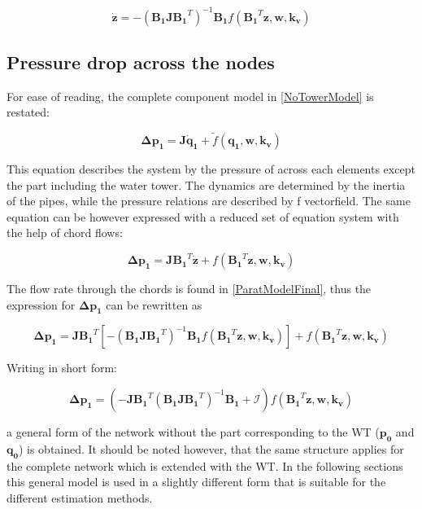 \begin{equation}
   \pmb{\dot{z}}  = - (\pmb{B_1 J {B_1}}^T)^{-1}\pmb{B_1} f({\pmb{B_1}}^T \pmb{z},\pmb{ w}, \pmb{k_v})
   \label{ParatModelFinal}
 \end{equation}

\subsection{Pressure drop across the nodes}
\label{ModelRelationSection}

For ease of reading, the complete component model in \eqref{NoTowerModel} is restated: 

\begin{equation}
  \pmb{\Delta p_1} =  \pmb{J} \pmb{\dot{q}_1} + \tilde{f}(\pmb{q_1}, \pmb{w}, \pmb{k_v})
  \label{RecallModel}
\end{equation}

This equation describes the system by the pressure of across each elements except the part including the water tower. The dynamics are determined by the inertia of the pipes, while the pressure relations are described by f vectorfield. 
The same equation can be however expressed with a reduced set of equation system with the help of chord flows: 

\begin{equation}
  \pmb{\Delta p_1} =  \pmb{J {B_1}}^T \pmb{\dot{z}} + f({\pmb{B_1}}^T \pmb{z}, \pmb{w}, \pmb{k_v})
 \end{equation}

The flow rate through the chords is found in \eqref{ParatModelFinal}, thus the expression for $ \pmb{\Delta p_1} $ can be rewritten as

\begin{equation}
 \pmb{ \Delta p_1} = \pmb{ J {B_1}}^T [- (\pmb{B_1 J {B_1}}^T)^{-1}\pmb{B_1} f({\pmb{B_1}}^T \pmb{z},\pmb{ w}, \pmb{k_v})] + f({\pmb{B_1}}^T \pmb{z},\pmb{ w}, \pmb{k_v})
  \label{PressureLarge}
 \end{equation}
 
Writing in short form:
 
 \begin{equation}
  \pmb{\Delta p_1} =  (-\pmb{J {B_1}}^T (\pmb{B_1 J {B_1}}^T)^{-1}\pmb{B_1} + \pmb{\mathcal{I}}) f({\pmb{B_1}}^T \pmb{z}, \pmb{w}, \pmb{k_v})
  \label{PressureShort}
 \end{equation}

a general form of the network without the part corresponding to the WT ($\pmb{p_0}$ and $\pmb{q_0}$) is obtained. It should be noted however, that the same structure applies for the complete network which is extended with the WT. In the following sections this general model is used in a slightly different form that is suitable for the different estimation methods. 


